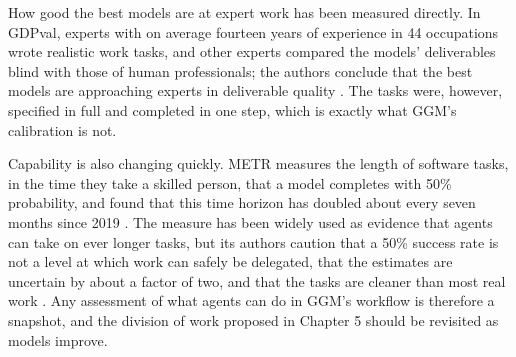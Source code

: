 How good the best models are at expert work has been measured directly.
In GDPval, experts with on average fourteen years of experience in 44 occupations wrote realistic work tasks, and other experts compared the models' deliverables blind with those of human professionals; the authors conclude that the best models are approaching experts in deliverable quality \citep{patwardhan2025gdpval}.
The tasks were, however, specified in full and completed in one step, which is exactly what GGM's calibration is not.

Capability is also changing quickly.
METR measures the length of software tasks, in the time they take a skilled person, that a model completes with 50\% probability, and found that this time horizon has doubled about every seven months since 2019 \citep{kwa2025measuring}.
The measure has been widely used as evidence that agents can take on ever longer tasks, but its authors caution that a 50\% success rate is not a level at which work can safely be delegated, that the estimates are uncertain by about a factor of two, and that the tasks are cleaner than most real work \citep{metr2026clarifying}.
Any assessment of what agents can do in GGM's workflow is therefore a snapshot, and the division of work proposed in Chapter 5 should be revisited as models improve.
